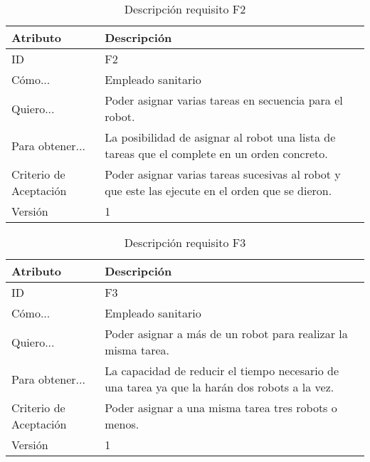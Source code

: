 \begin{table}[H]
    \label{tab:reqF2}
 	\caption{Descripción requisito F2}
	\centering
	
	\begin{tabular}{C{3cm}|C{12cm}}
 		\toprule
 		\textbf{Atributo} & \textbf{Descripción} \\
 		\midrule
 	    ID & F2 \\
 	    Cómo... & Empleado sanitario \\
 	    Quiero... & Poder asignar varias tareas en secuencia para el robot. \\
 	    Para obtener... & La posibilidad de asignar al robot una lista de tareas que el complete en un orden concreto.  \\
 	    Criterio de Aceptación & Poder asignar varias tareas sucesivas al robot y que este las ejecute en el orden que se dieron. \\
 	    Versión & 1 \\
 		\bottomrule
 		\end{tabular}
\end{table}

\begin{table}[H]
    \label{tab:reqF3}
 	\caption{Descripción requisito F3}
	\centering
	
	\begin{tabular}{C{3cm}|C{12cm}}
 		\toprule
 		\textbf{Atributo} & \textbf{Descripción} \\
 		\midrule
 	    ID & F3 \\
 	    Cómo... & Empleado sanitario \\
 	    Quiero... & Poder asignar a más de un robot para realizar la misma tarea. \\
 	    Para obtener... & La capacidad de reducir el tiempo necesario de una tarea ya que la harán dos robots a la vez.  \\
 	    Criterio de Aceptación & Poder asignar a una misma tarea tres robots o menos. \\
 	    Versión & 1 \\
 		\bottomrule
 		\end{tabular}
\end{table}

